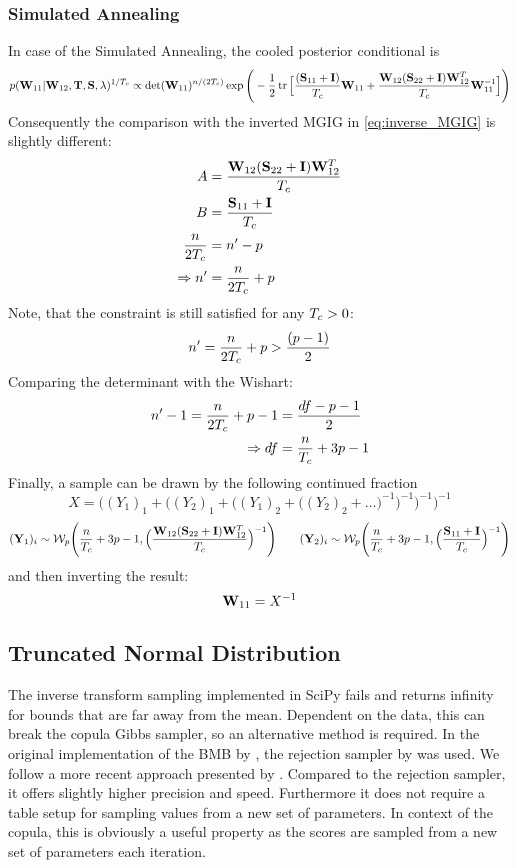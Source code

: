 \subsubsection*{Simulated Annealing}
In case of the Simulated Annealing, the cooled posterior conditional is 
\[
	p(\mathbf{W}_{11} | \mathbf{W}_{12}, \mathbf{T}, \mathbf{S}, \lambda)^{1/T_{c}}
	\propto
	\det(\mathbf{W}_{11})^{n/(2T_{c})}
	\exp \Bigg(
	-\frac{1}{2} \operatorname{tr}\Big[
		\frac{(\mathbf{S}_{11}+ \mathbf{I})}{T_{c}}\mathbf{W}_{11} + \frac{\mathbf{W}_{12}(\mathbf{S}_{22}+\mathbf{I})\mathbf{W}_{12}^T}{T_{c}} \mathbf{W}_{11}^{-1}
	\Big]
	\Bigg)
\]
Consequently the comparison with the inverted MGIG in \autoref{eq:inverse_MGIG} is slightly different:
\begin{align*}
	A              & =  \frac{\mathbf{W}_{12}(\mathbf{S}_{22}+\mathbf{I})\mathbf{W}_{12}^T }{T_{c}} 
	\\
	B              & = \frac{\mathbf{S}_{11}+ \mathbf{I}}{T_{c}}                                
	\\
	\frac{n}{2T_{c}} & = n'-p                                                               \\
	\Rightarrow n' & = \frac{n}{2T_{c}}+p                                                   
\end{align*}
Note, that the constraint is still satisfied for any $T_{c}>0$:
$$
n' = \frac{n}{2T_{c}}+p > \frac{(p-1)}{2}
$$
Comparing the determinant with the Wishart:
\begin{align*}
	n'-1=\frac{n}{2T_{c}}+p-1 & = \frac{df-p-1}{2}   
	\\
	\Rightarrow df          & = \frac{n}{T_{c}}+3p-1 
\end{align*}
Finally, a sample can be drawn by the following continued fraction
$$
X = \Big((Y_1)_1 + 
\Big((Y_2)_1 + 
\Big( (Y_1)_2 + 
\Big( (Y_2)_2 + \dots \Big)^{-1} 
\Big)^{-1} 
\Big)^{-1}
\Big)^{-1}
$$
$$
(\mathbf{Y}_1)_i 
\sim 
\mathcal{W}_p
\Bigg(
\frac{n}{T_{c}}+3p-1, 
\Big(
\frac{\mathbf{W}_{12}(\mathbf{S}_{22}+\mathbf{I})\mathbf{W}_{12}^T }{T_{c}}
\Big)^{-1}
\Bigg)
\quad \quad
(\mathbf{Y}_2)_i 
\sim 
\mathcal{W}_p 
\Bigg(
\frac{n}{T_{c}}+3p-1, 
\Big(
\frac{\mathbf{S}_{11}+ \mathbf{I}}{T_{c}}
\Big)^{-1}
\Bigg)
$$
and then inverting the result:
$$
\mathbf{W}_{11} = {X}^{-1}
$$
\subsection{Truncated Normal Distribution}
The inverse transform sampling implemented in SciPy fails and returns infinity for bounds that are far away from the mean.
Dependent on the data, this can break the copula Gibbs sampler, so an alternative method is required.
In the original implementation of the BMB by \citet{kaufmann_bayesian_2015}, the rejection sampler by \citet{geweke1991efficient} was used.
We follow a more recent approach presented by \citet{chopin2011fast}.
Compared to the rejection sampler, it offers slightly higher precision and speed.
Furthermore it does not require a table setup for sampling values from a new set of parameters.
In context of the copula, this is obviously a useful property as the scores are sampled from a new set of parameters each iteration.

